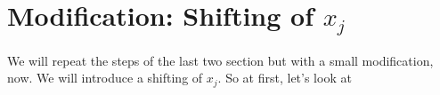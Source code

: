 \section{Modification: Shifting of $x_{j}$}
\label{s:modshiftingxj}
We will repeat the steps of the last two section but with a small modification, now. We will introduce a shifting of $x_{j}$. So at first, let's look at
